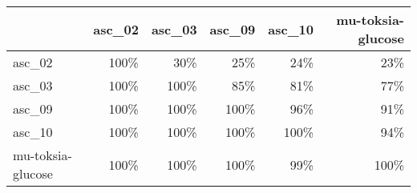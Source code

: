 \begin{tabular}{lrrrrr}
\toprule
 & asc_02 & asc_03 & asc_09 & asc_10 & mu-toksia-glucose \\
\midrule
asc_02 & 100\% & 30\% & 25\% & 24\% & 23\% \\
asc_03 & 100\% & 100\% & 85\% & 81\% & 77\% \\
asc_09 & 100\% & 100\% & 100\% & 96\% & 91\% \\
asc_10 & 100\% & 100\% & 100\% & 100\% & 94\% \\
mu-toksia-glucose & 100\% & 100\% & 100\% & 99\% & 100\% \\
\bottomrule
\end{tabular}
